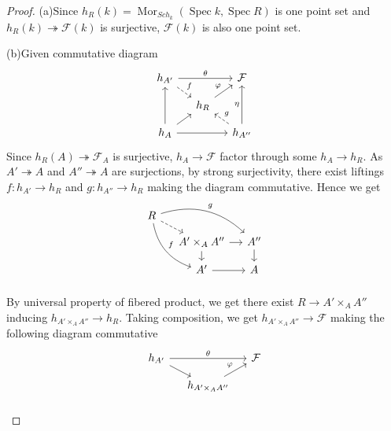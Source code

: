 \documentclass{ctexart}
\newcommand{\mor}{\operatorname{Mor}}
\newcommand{\spec}{\operatorname{Spec}}
\begin{document}
\begin{proof}
    (a)Since $h_{R}(k) = \mor_{Sch_{k}}(\spec k, \spec R)$ is one point set and $h_{R}(k) \twoheadrightarrow \mathcal{F}(k)$ is surjective,
    $\mathcal{F}(k)$ is also one point set. 
    \par
    (b)Given commutative diagram
    \begin{equation}
        \begin{tikzcd}[sep = small]
            h_{A'} \arrow[rr, "\theta"] \arrow[dr, dashrightarrow, "f"] &&
            \mathcal{F} \\
            & h_{R} \arrow[ur, "\varphi"] & \\
            h_{A} \arrow[uu] \arrow[ur] \arrow[rr] &&
            h_{A''} \arrow[ul, dashrightarrow, "g" swap] \arrow[uu, "\eta"]
        \end{tikzcd}
    \end{equation}
    Since $h_{R}(A) \twoheadrightarrow \mathcal{F}_{A}$ is surjective, $h_{A} \rightarrow \mathcal{F}$ factor through some $h_{A} \rightarrow h_{R}$.
    As $A' \twoheadrightarrow A$ and $A'' \twoheadrightarrow A$ are surjections, by strong surjectivity, 
    there exist liftings $f: h_{A'} \rightarrow h_{R}$ and $g: h_{A''} \rightarrow h_{R}$ making the diagram commutative.
    Hence we get
    \begin{equation}
        \begin{tikzcd}[sep = small]
            R \arrow[drr, "g", bend left] \arrow[dr, dashrightarrow] \arrow[ddr, "f", bend right] && \\
            & A' \times_{A} A'' \arrow[r] \arrow[d] & 
            A'' \arrow[d] \\
            & A' \arrow[r] &
            A \\
        \end{tikzcd}
        \label{equation:proposition_versal_family_b_fibered_product}
    \end{equation}
    By universal property of fibered product, we get there exist $R \rightarrow A' \times_{A} A''$ inducing $h_{A' \times_{A} A''} \rightarrow h_{R}$.
    Taking composition, we get $h_{A' \times_{A} A''} \rightarrow \mathcal{F}$ making the following diagram commutative
    \begin{equation}
        \begin{tikzcd}[sep = small]
            h_{A'} \arrow[rr, "\theta"] \arrow[dr] &&
            \mathcal{F} \\
            & h_{A' \times_{A} A''} \arrow[ur, "\varphi"] & \\

\end{tikzcd}
\end{equation}
\end{proof}
\end{document}
